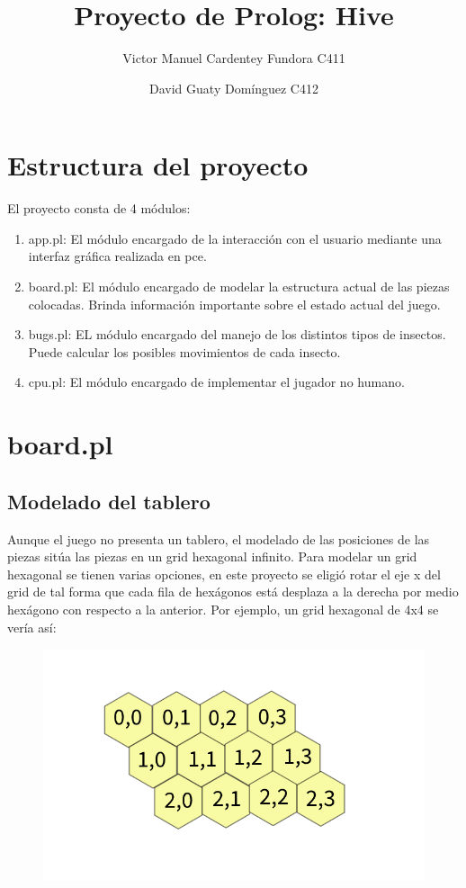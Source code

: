 \documentclass[12pt,letterpaper]{article}
\title{Proyecto de Prolog: Hive}
\author{}
\author{Victor Manuel Cardentey Fundora C411 \and David Guaty Dom\'inguez C412}
\date{}
\begin{document}
\maketitle
\section*{Estructura del proyecto}
El proyecto consta de 4 m\'odulos:
\begin{enumerate}
	\item app.pl: El m\'odulo encargado de la interacci\'on con el usuario mediante una interfaz gr\'afica realizada en pce.
	\item board.pl: El m\'odulo encargado de modelar la estructura actual de las piezas colocadas. Brinda informaci\'on importante sobre el estado actual del juego.
	\item bugs.pl: EL m\'odulo encargado del manejo de los distintos tipos de insectos. Puede calcular los posibles movimientos de cada insecto.
	\item cpu.pl: El m\'odulo encargado de implementar el jugador no humano.
\end{enumerate}

\section*{board.pl}
\subsection*{Modelado del tablero}
	Aunque el juego no presenta un tablero, el modelado de las posiciones de las piezas sit\'ua las piezas en un grid hexagonal infinito. Para modelar un grid hexagonal se tienen varias opciones, en este proyecto se eligi\'o rotar el eje x del grid de tal forma que cada fila de hex\'agonos est\'a desplaza a la derecha por medio hex\'agono con respecto a la anterior. Por ejemplo, un grid hexagonal de 4x4 se ver\'ia as\'i:
	\begin{figure}[H]
		\centering
		\includegraphics[width=0.7\linewidth]{hexgrid}
		\label{fig:hexgrid}
	\end{figure}
\end{document}
